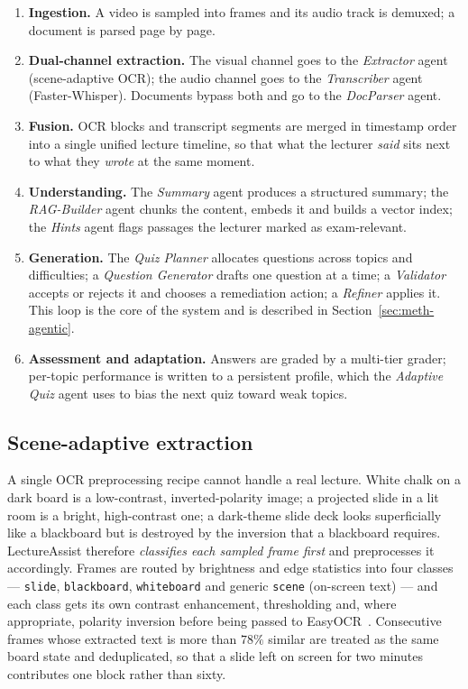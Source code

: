 \begin{enumerate}
  \item \textbf{Ingestion.} A video is sampled into frames and its audio track is
        demuxed; a document is parsed page by page.
  \item \textbf{Dual-channel extraction.} The visual channel goes to the
        \emph{Extractor} agent (scene-adaptive OCR); the audio channel goes to the
        \emph{Transcriber} agent (Faster-Whisper). Documents bypass both and go to
        the \emph{DocParser} agent.
  \item \textbf{Fusion.} OCR blocks and transcript segments are merged in
        timestamp order into a single unified lecture timeline, so that what the
        lecturer \emph{said} sits next to what they \emph{wrote} at the same moment.
  \item \textbf{Understanding.} The \emph{Summary} agent produces a structured
        summary; the \emph{RAG-Builder} agent chunks the content, embeds it and
        builds a vector index; the \emph{Hints} agent flags passages the lecturer
        marked as exam-relevant.
  \item \textbf{Generation.} The \emph{Quiz Planner} allocates questions across
        topics and difficulties; a \emph{Question Generator} drafts one question at
        a time; a \emph{Validator} accepts or rejects it and chooses a remediation
        action; a \emph{Refiner} applies it. This loop is the core of the system and
        is described in Section~\ref{sec:meth-agentic}.
  \item \textbf{Assessment and adaptation.} Answers are graded by a multi-tier
        grader; per-topic performance is written to a persistent profile, which the
        \emph{Adaptive Quiz} agent uses to bias the next quiz toward weak topics.
\end{enumerate}

\subsection{Scene-adaptive extraction}
\label{sec:meth-ocr}

A single OCR preprocessing recipe cannot handle a real lecture. White chalk on a
dark board is a low-contrast, inverted-polarity image; a projected slide in a lit
room is a bright, high-contrast one; a dark-theme slide deck looks superficially
like a blackboard but is destroyed by the inversion that a blackboard requires.
LectureAssist therefore \emph{classifies each sampled frame first} and preprocesses
it accordingly. Frames are routed by brightness and edge statistics into four
classes --- \texttt{slide}, \texttt{blackboard}, \texttt{whiteboard} and generic
\texttt{scene} (on-screen text) --- and each class gets its own contrast
enhancement, thresholding and, where appropriate, polarity inversion before being
passed to EasyOCR~\cite{easyocr}. Consecutive frames whose extracted text is more than $78\%$
similar are treated as the same board state and deduplicated, so that a slide left
on screen for two minutes contributes one block rather than sixty.

